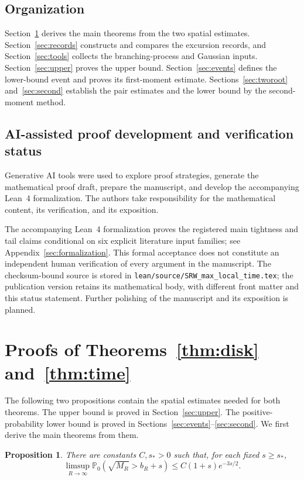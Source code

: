 \documentclass[11pt,letterpaper,reqno]{amsart}
\numberwithin{equation}{section}
\newtheorem{proposition}[theorem]{Proposition}
\theoremstyle{remark}
\begin{document}
\subsection{Organization}\label{sec:organization}
Section~\ref{sec:mainproofs} derives the main theorems from the two spatial estimates. Section~\ref{sec:records} constructs and compares the excursion records, and Section~\ref{sec:tools} collects the branching-process and Gaussian inputs. Section~\ref{sec:upper} proves the upper bound. Section~\ref{sec:events} defines the lower-bound event and proves its first-moment estimate. Sections~\ref{sec:tworoot} and~\ref{sec:second} establish the pair estimates and the lower bound by the second-moment method.

\subsection{AI-assisted proof development and verification status}
\label{subsec:ai-declaration}

Generative AI tools were used to explore proof strategies, generate the mathematical proof draft, prepare the manuscript, and develop the accompanying Lean~4 formalization. The authors take responsibility for the mathematical content, its verification, and its exposition.

The accompanying Lean~4 formalization proves the registered main tightness and tail claims conditional on six explicit literature input families; see Appendix~\ref{sec:formalization}. This formal acceptance does not constitute an independent human verification of every argument in the manuscript. The checksum-bound source is stored in \texttt{lean/source/}\allowbreak\texttt{SRW\_max\_local\_time.tex}; the publication version retains its mathematical body, with different front matter and this status statement. Further polishing of the manuscript and its exposition is planned.

\section{Proofs of Theorems~\ref{thm:disk} and~\ref{thm:time}}\label{sec:mainproofs}
The following two propositions contain the spatial estimates needed for both theorems. The upper bound is proved in Section~\ref{sec:upper}. The positive-probability lower bound is proved in Sections~\ref{sec:events}--\ref{sec:second}. We first derive the main theorems from them.

\begin{proposition}\label{prop:upper}
There are constants $C,s_*>0$ such that, for each fixed $s\ge s_*$,
\[
\limsup_{R\to\infty}\mathbb P_0(\sqrt{M_R}>b_R+s)
\le C(1+s)e^{-3s/2}.
\]
\end{proposition}
\end{document}
